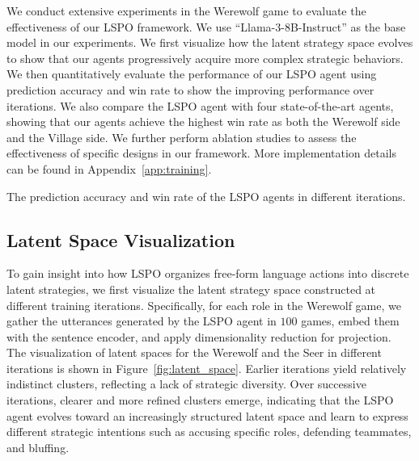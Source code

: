 We conduct extensive experiments in the Werewolf game to evaluate the effectiveness of our LSPO framework. We use ``Llama-3-8B-Instruct'' as the base model in our experiments. We first visualize how the latent strategy space evolves to show that our agents progressively acquire more complex strategic behaviors. We then quantitatively evaluate the performance of our LSPO agent using prediction accuracy and win rate to show the improving performance over iterations.  We also compare the LSPO agent with four state-of-the-art agents, showing that our agents achieve the highest win rate as both the Werewolf side and the Village side. We further perform ablation studies to assess the effectiveness of specific designs in our framework. More implementation details can be found in Appendix~\ref{app:training}. 


\begin{table*}[t]
    \centering
    
    \caption{The prediction accuracy and win rate of the LSPO agents in different iterations.}
    \label{tab:iteration}
\end{table*}


\subsection{Latent Space Visualization}

To gain insight into how LSPO organizes free-form language actions into discrete latent strategies, we first visualize the latent strategy space constructed at different training iterations. Specifically, for each role in the Werewolf game, we gather the utterances generated by the LSPO agent in $100$ games, embed them with the sentence encoder, and apply dimensionality reduction for projection. The visualization of latent spaces for the Werewolf and the Seer in different iterations is shown in Figure~\ref{fig:latent_space}. Earlier iterations yield relatively indistinct clusters, reflecting a lack of strategic diversity. Over successive iterations, clearer and more refined clusters emerge, indicating that the LSPO agent evolves toward an increasingly structured latent space and learn to express different strategic intentions such as accusing specific roles, defending teammates, and bluffing.

